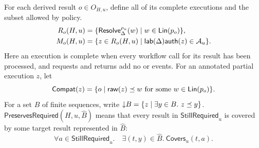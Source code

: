 For each derived result \(o\in O_{H,u}\), define all of its complete executions and the subset allowed by policy.
\begin{equation}
\label{eq:safe-completions}
\begin{aligned}
 R_o(H,u)&=\{\mathsf{Resolve}^{\rho_u}_\Delta(w)\mid w\in\mathsf{Lin}(p_o)\},\\
 M_o(H,u)&=\{z\in R_o(H,u)\mid
   \mathsf{lab}(\Delta)\mathsf{auth}(z)\in\mathcal A_u\}.
\end{aligned}
\end{equation}
Here an execution is complete when every workflow call for its result has been processed, and requests and returns add no \Fresh or \Alias events.
For an annotated partial execution \(z\), let
\[
 \mathsf{Compat}(z)=
 \{o\mid \mathsf{raw}(z)\preceq w
		          \text{ for some }w\in\mathsf{Lin}(p_o)\}.
\]
For a set \(B\) of finite sequences, write
\(\mathord{\downarrow} B=\{z\mid \exists y\in B.\ z\preceq y\}\).
\(\mathsf{PreservesRequired}(H,u,\widehat B)\) means that every result in \(\mathsf{StillRequired}_u\) is covered by some target result represented in \(\widehat B\):
\[
 \forall a\in\mathsf{StillRequired}_u.\quad
 \exists (t,y)\in\widehat B.\ \mathsf{Covers}_u(t,a).
\]

